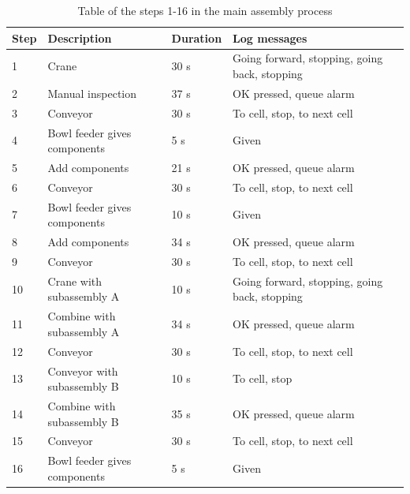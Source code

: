 \documentclass[journal]{IEEEtran}
\begin{document}
\begin{table}[!t]
\renewcommand{\arraystretch}{1.3}
\caption{Table of the steps 1-16 in the main assembly process}
\label{mainsteps1}
\centering
\begin{tabular}{|p{5mm}|p{20mm}|p{10mm}|p{15mm}|p{15mm}|}
\hline
Step & Description & Duration & Log messages \\
\hline
\hline
1 & Crane & 30 s & Going forward, stopping, going back, stopping \\
\hline
2 & Manual inspection & 37 s & OK pressed, queue alarm \\
\hline
3 & Conveyor & 30 s & To cell, stop, to next cell \\
\hline
4 & Bowl feeder gives components & 5 s & Given \\
\hline
5 & Add components & 21 s & OK pressed, queue alarm \\
\hline
6 & Conveyor & 30 s & To cell, stop, to next cell \\
\hline
7 & Bowl feeder gives components & 10 s & Given \\
\hline
8 & Add components & 34 s & OK pressed, queue alarm \\
\hline
9 & Conveyor & 30 s & To cell, stop, to next cell \\
\hline
10 & Crane with subassembly A & 10 s & Going forward, stopping, going back, stopping \\
\hline
11 & Combine with subassembly A & 34 s & OK pressed, queue alarm \\
\hline
12 & Conveyor & 30 s & To cell, stop, to next cell \\
\hline
13 & Conveyor with subassembly B & 10 s & To cell, stop \\
\hline
14 & Combine with subassembly B & 35 s & OK pressed, queue alarm \\
\hline
15 & Conveyor & 30 s & To cell, stop, to next cell \\
\hline
16 & Bowl feeder gives components & 5 s & Given \\
\hline
\end{tabular}
\end{table}
\end{document}
